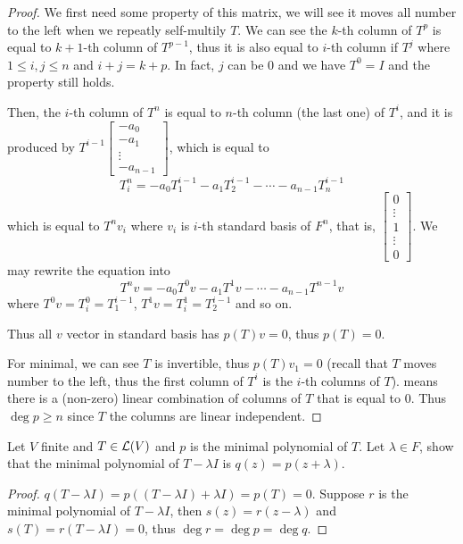 \documentclass[../main.tex]{subfiles}
\begin{document}
\begin{proof}
  We first need some property of this matrix, we will see it moves
  all number to the left when we repeatly self-multily $T$.
  We can see the $k$-th column of $T^p$
  is equal to $k + 1$-th column of $T^{p - 1}$, thus
  it is also equal to $i$-th column if $T^j$
  where $1 \le i, j \le n$ and $i + j = k + p$.
  In fact, $j$ can be $0$ and we have $T^0 = I$ and the property
  still holds.

  Then, the $i$-th column of $T^n$ is equal to $n$-th column (the last one) of $T^i$,
  and it is produced by $T^{i - 1}\begin{bmatrix}
    - a_0 \\
    - a_1 \\
    \vdots \\
    - a_{n - 1}
  \end{bmatrix}$, which is equal to
  \[
  T^n_i = - a_0 T^{i - 1}_1 - a_1 T^{i - 1}_2 - \cdots - a_{n - 1} T^{i - 1}_n
  \]
  which is equal to $T^n v_i$ where $v_i$ is $i$-th standard basis of $F^n$,
  that is, $\begin{bmatrix}
    0 \\
    \vdots \\
    1 \\
    \vdots \\
    0
  \end{bmatrix}$. We may rewrite the equation into
  \[
  T^nv = -a_0 T^0v - a_1T^1v - \cdots - a_{n - 1}T^{n - 1}v
  \]
  where $T^0v = T^0_i = T^{i - 1}_1$, $T^1v = T^1_i = T^{i - 1}_2$ and so on.

  Thus all $v$ vector in standard basis has $p(T)v = 0$, thus $p(T) = 0$.

  For minimal, we can see $T$ is invertible, thus $p(T)v_1 = 0$
  (recall that $T$ moves number to the left, thus the first column of $T^i$ is the $i$-th columns of $T$).
  means there is a (non-zero) linear combination of columns of $T$ that is equal to $0$.
  Thus $\deg p \ge n$ since $T$ the columns are linear independent.
\end{proof}

\begin{exercise}
  Let $V$ finite and $T \in \mathcal{L}(V)$ and $p$ is the minimal polynomial of $T$.
  Let $\lambda \in F$, show that the minimal polynomial of $T - \lambda I$
  is $q(z) = p(z + \lambda)$.
\end{exercise}
\begin{proof}
  $q(T - \lambda I) = p((T - \lambda I) + \lambda I) = p(T) = 0$.
  Suppose $r$ is the minimal polynomial of $T - \lambda I$,
  then $s(z) = r(z - \lambda)$ and $s(T) = r(T - \lambda I) = 0$, thus $\deg r = \deg p = \deg q$.
\end{proof}
\end{document}
